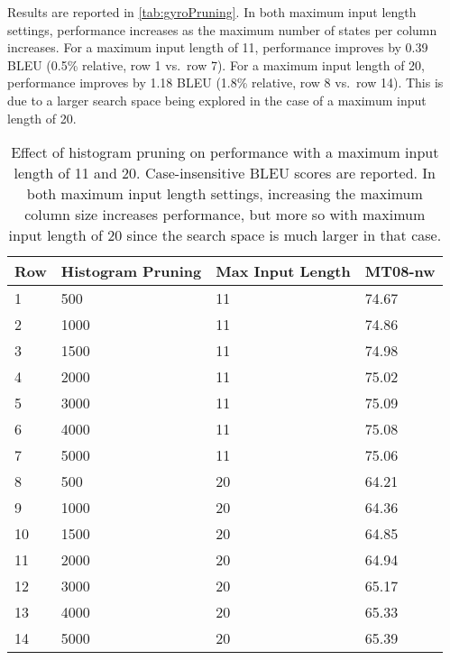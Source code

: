 Results are reported in \autoref{tab:gyroPruning}.
In both maximum input
length settings, performance increases as the maximum number of states per
column increases. For a maximum input length of 11, performance improves by
0.39 BLEU (0.5\% relative, row 1 vs.\ row 7). For a maximum input length of 20, performance improves
by 1.18 BLEU (1.8\% relative, row 8 vs.\ row 14). This is due to a larger search space being
explored in the case of a maximum input length of 20.
%
\begin{table}
  \begin{center}
  \begin{tabular}{l|l|l|l}
    Row & Histogram Pruning & Max Input Length & MT08-nw \\
    \hline
    1 & 500  & 11 & 74.67 \\
    2 & 1000 & 11 & 74.86 \\
    3 & 1500 & 11 & 74.98 \\
    4 & 2000 & 11 & 75.02 \\
    5 & 3000 & 11 & 75.09 \\
    6 & 4000 & 11 & 75.08 \\
    7 & 5000 & 11 & 75.06 \\
    \hline
    8 & 500  & 20 & 64.21 \\
    9 & 1000 & 20 & 64.36 \\
    10 & 1500 & 20 & 64.85 \\
    11 & 2000 & 20 & 64.94 \\
    12 & 3000 & 20 & 65.17 \\
    13 & 4000 & 20 & 65.33 \\
    14 & 5000 & 20 & 65.39 \\
  \end{tabular}
  \caption{Effect of histogram pruning on performance with a maximum input length
    of 11 and 20. Case-insensitive BLEU scores are reported. 
    In both maximum input length settings,
    increasing the maximum column size increases performance, but
    more so with maximum input length of 20 since the search space
    is much larger in that case.}
  \label{tab:gyroPruning}
  \end{center}
\end{table}

